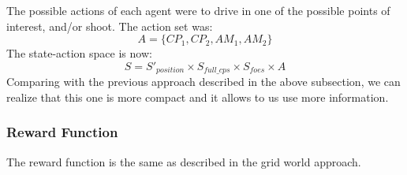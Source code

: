 \documentclass[conference]{IEEEtran}
\begin{document}
The possible actions of each agent were to drive in one of the possible points of interest, and/or shoot.
The action set was:
\begin{equation}
A = \lbrace CP_1, CP_2, AM_1, AM_2 \rbrace
\end{equation}
The state-action space is now:
\begin{equation}
S = S'_{position} \times S_{full\_cps} \times S_{foes} \times A
\end{equation}
Comparing with the previous approach described in the above subsection, we can realize that this one is more compact and it allows to us use more information.
\subsubsection{Reward Function}
The reward function is the same as described in the grid world approach.
\end{document}
